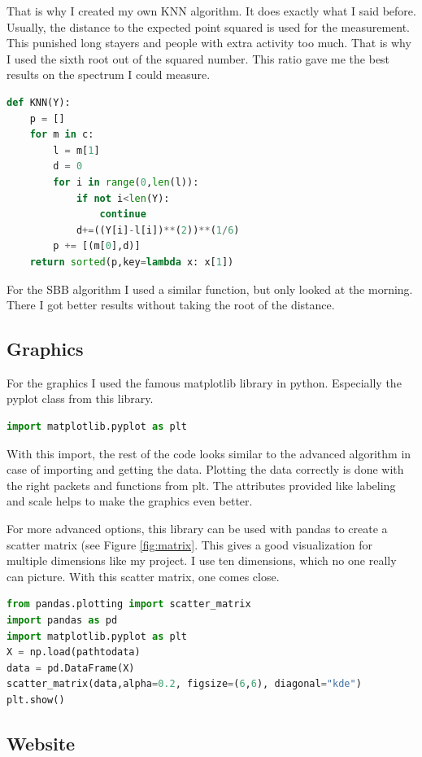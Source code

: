 \documentclass[11pt]{article}
\begin{document}
That is why I created my own KNN algorithm. It does exactly what I said before. Usually, the distance to the expected point squared is used for the measurement. This punished long stayers and people with extra activity too much. That is why I used the sixth root out of the squared number. This ratio gave me the best results on the spectrum I could measure.
\begin{lstlisting}[language=Python, caption="own KNN",style=python]
def KNN(Y):
    p = []
    for m in c:
        l = m[1]
        d = 0
        for i in range(0,len(l)):
            if not i<len(Y):
                continue
            d+=((Y[i]-l[i])**(2))**(1/6)
        p += [(m[0],d)]
    return sorted(p,key=lambda x: x[1])
\end{lstlisting}
For the SBB algorithm I used a similar function, but only looked at the morning. There I got better results without taking the root of the distance. 

\subsection{Graphics}
For the graphics I used the famous matplotlib library in python. Especially the pyplot class from this library.
\begin{lstlisting}[language=Python, caption="graphic import",style=python]
import matplotlib.pyplot as plt
\end{lstlisting}
With this import, the rest of the code looks similar to the advanced algorithm in case of importing and getting the data. Plotting the data correctly is done with the right packets and functions from plt. The attributes provided like labeling and scale helps to make the graphics even better.

For more advanced options, this library can be used with pandas to create a scatter matrix (see Figure \ref{fig:matrix}. This gives a good visualization for multiple dimensions like my project. I use ten dimensions, which no one really can picture. With this scatter matrix, one comes close.

\begin{lstlisting}[language=Python,caption="graphic example",style=python]
from pandas.plotting import scatter_matrix
import pandas as pd
import matplotlib.pyplot as plt
X = np.load(pathtodata)
data = pd.DataFrame(X)
scatter_matrix(data,alpha=0.2, figsize=(6,6), diagonal="kde")
plt.show()
\end{lstlisting}

\subsection{Website}
\end{document}
